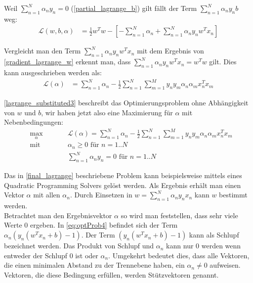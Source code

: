 \documentclass[a4paper,11pt,twoside]{scrreprt}
\newcommand{\Lagr}{\mathcal{L}}
\begin{document}
Weil $\sum_{n=1}^{N} \alpha_{n} y_{n} = 0$ (\autoref{partial_lagrange_b}) gilt fällt der Term $\sum_{n=1}^{N} \alpha_{n} y_{n} b$ weg:
\begin{equation} \label{lagrange_substituted2}
	\begin{aligned}
		\Lagr(w, b, \alpha) &= \frac{1}{2} w^{T} w - [-\sum_{n=1}^{N} \alpha_{n} + \sum_{n=1}^{N} \alpha_{n} y_{n} w^{T} x_{n}]
	\end{aligned}
\end{equation}

Vergleicht man den Term $\sum_{n=1}^{N} \alpha_{n} y_{n} w^{T} x_{n}$ mit dem Ergebnis von \autoref{gradient_lagrange_w} erkennt man, dass $\sum_{n=1}^{N} \alpha_{n} y_{n} w^{T} x_{n} = w^T w$ gilt. Dies kann ausgeschrieben werden als:
\begin{equation} \label{lagrange_substituted3}
	\begin{aligned}
		\Lagr(\alpha) &= \sum_{n=1}^{N }\alpha_{n} - \frac{1}{2} \sum_{n=1}^{N} \sum_{m=1}^{M} y_{n} y_{m} \alpha_{n} \alpha_{m} x_{n}^{T} x_{m}
	\end{aligned}
\end{equation}

\autoref{lagrange_substituted3} beschreibt das Optimierungsproblem ohne Abhängigkeit von $w$ und $b$, wir haben jetzt also eine Maximierung für $\alpha$ mit Nebenbedingungen:
\begin{subequations} \label{final_lagrange}
	\begin{alignat}{2}
		&\!\max_{\alpha}        &\qquad&  	\Lagr(\alpha) = \sum_{n=1}^{N} \alpha_{n} - \frac{1}{2} \sum_{n=1}^{N} \sum_{m=1}^{M} y_{n} y_{m} \alpha_{n} \alpha_{m} x_{n}^{T} x_{m} \label{eq:optProb5}\\
		&\text{mit } &      & \alpha_{n} \geq 0 \text{ für } n=1..N \label{eq:constraint16}\\
		&       & & \sum_{n=1}^{N} \alpha_{n} y_{n} = 0\text{ für } n=1..N \label{eq:constraint17}
	\end{alignat}
\end{subequations}

Das in \autoref{final_lagrange} beschriebene Problem kann beispielsweise mittels eines Quadratic Programming Solvers gelöst werden. Als Ergebnis erhält man einen Vektor $\alpha$ mit allen $\alpha_{n}$. Durch Einsetzen in $w = \sum_{n=1}^{N} \alpha_{n} y_{n} x_{n}$ kann $w$ bestimmt werden. \\

Betrachtet man den Ergebnisvektor $\alpha$ so wird man feststellen, dass sehr viele Werte $0$ ergeben. In \autoref{eq:optProb4} befindet sich der Term $\alpha_{n} (y_n (w^{T} x_{n} + b)-1)$. Der Term $(y_n (w^{T} x_{n} + b)-1)$ kann als Schlupf bezeichnet werden. Das Produkt von Schlupf und $\alpha_{n}$ kann nur $0$ werden wenn entweder der Schlupf $0$ ist oder $\alpha_{n}$. Umgekehrt bedeutet dies, dass alle Vektoren, die einen minimalen Abstand zu der Trennebene haben, ein $\alpha_{n} \neq 0$ aufweisen. Vektoren, die diese Bedingung erfüllen, werden Stützvektoren genannt. \\
\end{document}
